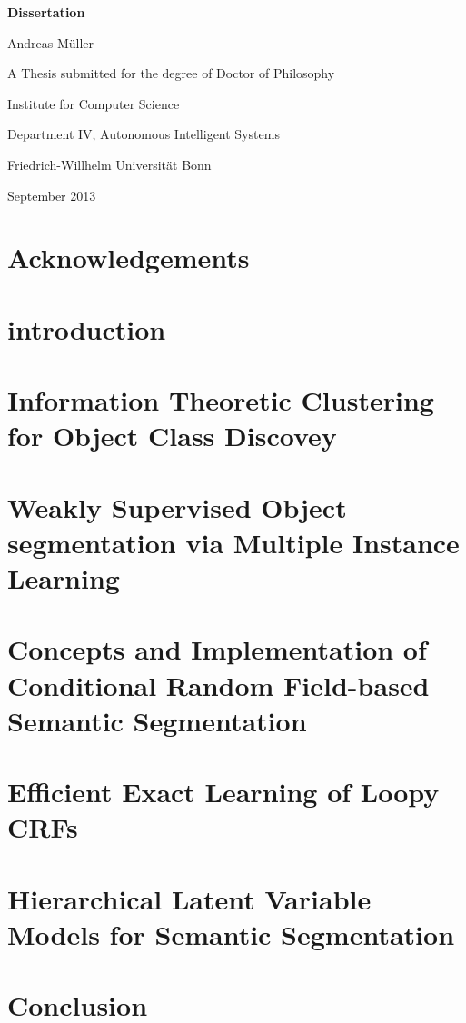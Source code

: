 \documentclass[12pt,toc=bibnumbered, a4paper,twoside]{scrbook}
\begin{document}


\begin{titlepage}
\begin{center}
\vspace*{1in}
\textbf{{\LARGE Dissertation}}
\par
\vspace{1.5in} {\large Andreas M\"uller}
 \par \vfill A Thesis submitted for the degree of Doctor of Philosophy
\par \vspace{0.5in}
Institute for Computer Science \par
Department IV, Autonomous Intelligent Systems
\par \vspace{0.5in}
Friedrich-Willhelm Universit\"at Bonn \par
\vspace{0.5in} September 2013 \end{center}

\end{titlepage}


\tableofcontents

\chapter*{Acknowledgements}


\chapter{introduction}


\chapter{Information Theoretic Clustering for Object Class Discovey}


\chapter{Weakly Supervised Object segmentation via Multiple Instance Learning}



\chapter{Concepts and Implementation of Conditional Random Field-based Semantic Segmentation}



\chapter{Efficient Exact Learning of Loopy CRFs}



\chapter{Hierarchical Latent Variable Models for Semantic Segmentation}

\chapter{Conclusion}



\end{document}
